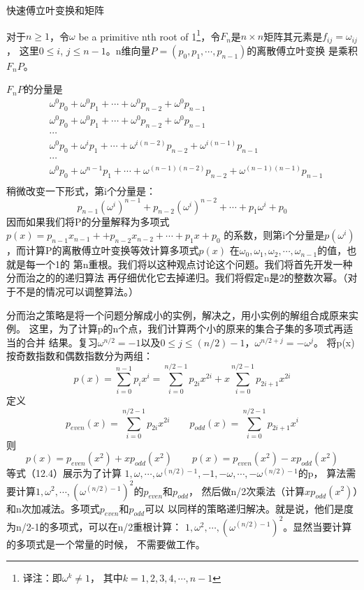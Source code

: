 \begin{definition}
快速傅立叶变换和矩阵

对于$n \geq 1$，令$\omega$ be a primitive nth root of 1\footnote{译注：即$\omega^k \neq 1$，
其中$k=1,2,3,4, \cdots,n-1$}，令$F_n$是$n\times n$矩阵其元素是$f_{ij}=\omega_{ij}$，
这里$0\leq i$, $j\leq n-1$。n维向量$P=(p_0,p_1,\cdots, p_{n-1})$的离散傅立叶变换
是乘积$F_nP$。
\end{definition}
$F_nP$的分量是
\begin{displaymath}
\begin{aligned}
&\omega^0p_0 + \omega^0p_1 + \cdots + \omega^0p_{n-2} + \omega^0p_{n-1}\\
&\omega^0p_0 + \omega^0p_1 + \cdots + \omega^0p_{n-2} + \omega^0p_{n-1}\\
&\cdots\\
&\omega^0p_0 + \omega^ip_1 + \cdots + \omega^{i(n-2)}p_{n-2} + \omega^{i(n-1)}p_{n-1}\\
&\cdots\\
&\omega^0p_0 + \omega^{n-1}p_1 + \cdots + \omega^{(n-1)(n-2)}p_{n-2} + \omega^{(n-1)(n-1)}p_{n-1}\\
\end{aligned}
\end{displaymath}
稍微改变一下形式，第i个分量是：
\begin{displaymath}
p_{n-1}(\omega^i)^{n-1}+p_{n-2}(\omega^i)^{n-2}+\cdots+p_1\omega^i+p_0
\end{displaymath}
因而如果我们将P的分量解释为多项式$p(x)=p_{n-1}x_{n-1}+ + p_{n-2}x_{n-2} + \cdots + p_1x + p_0$
的系数，则第i个分量是$p(\omega^i)$，而计算P的离散傅立叶变换等效计算多项式$p(x)$
在$\omega_0, \omega_1, \omega_2, \cdots, \omega_{n-1}$的值，也就是每一个1的
第n重根。我们将以这种观点讨论这个问题。我们将首先开发一种分而治之的的递归算法
再仔细优化它去掉递归。我们将假定n是2的整数次幂。（对于不是的情况可以调整算法。）

分而治之策略是将一个问题分解成小的实例，解决之，用小实例的解组合成原来实例。
这里，为了计算p的n个点，我们计算两个小的原来的集合子集的多项式再适当的合并
结果。复习$\omega^{n/2}=-1$以及$0\leq j\leq (n/2)-1$，$\omega^{n/2+j}=-\omega^j$。
将p(x)按奇数指数和偶数指数分为两组：
\begin{displaymath}
p(x)=\sum_{i=0}^{n-1}p_ix^i=\sum_{i=0}^{n/2-1}p_{2i}x^{2i}+x\sum_{i=0}^{n/2-1}p_{2i+1}x^{2i}
\end{displaymath}
定义
\begin{displaymath}
p_{even}(x)=\sum_{i=0}^{n/2-1}p_{2i}x^{2i} \qquad p_{odd}(x)=\sum_{i=0}^{n/2-1}p_{2i+1}x^{i}
\end{displaymath}
则
\begin{equation}
p(x)=p_{even}(x^2)+xp_{odd}(x^2) \qquad  p(x)=p_{even}(x^2)- xp_{odd}(x^2)
\end{equation}
等式（12.4）展示为了计算
$1, \omega, \cdots, \omega^{(n/2)-1}, -1, -\omega, \cdots, -\omega^{(n/2)-1}$的p，
算法需要计算$1, \omega^2, \cdots, (\omega^{(n/2)-1})^2$的$p_{even}$和$p_{odd}$，
然后做n/2次乘法（计算$xp_{odd}(x^2)$）和n次加减法。多项式$p_{even}$和$p_{odd}$可以
以同样的策略递归解决。就是说，他们是度为n/2-1的多项式，可以在n/2重根计算：
$1, \omega^2, \cdots, (\omega^{(n/2)-1})^2$。显然当要计算的多项式是一个常量的时候，
不需要做工作。

